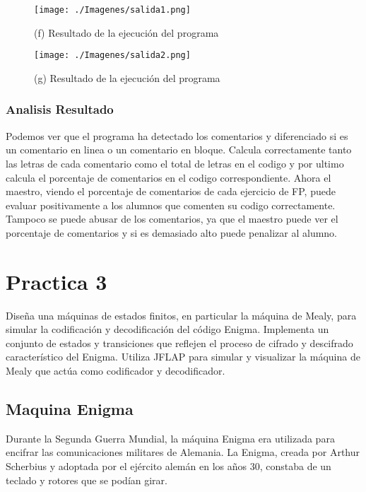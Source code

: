 \documentclass{article}
\begin{document}
        \newpage
        \begin{figure}[!h]
            \centering
            \texttt{[image: ./Imagenes/salida1.png]}
            \caption*{(f) Resultado de la ejecución del programa}
        \end{figure}

        \begin{figure}[!h]
            \centering
            \texttt{[image: ./Imagenes/salida2.png]}
            \caption*{(g) Resultado de la ejecución del programa}
        \end{figure}
        
        \subsubsection*{Analisis Resultado}
     Podemos ver que el programa ha detectado los comentarios y diferenciado si es un comentario en linea o 
     un comentario en bloque. Calcula correctamente tanto las letras de cada comentario como el total de letras en el codigo y por
     ultimo calcula el porcentaje de comentarios en el codigo  correspondiente.
     Ahora el maestro, viendo el porcentaje de comentarios de cada ejercicio de FP, puede evaluar positivamente a los alumnos que comenten su codigo correctamente.
     Tampoco se puede abusar de los comentarios, ya que el maestro puede ver el porcentaje de comentarios y si es demasiado alto puede penalizar al alumno.

    

    \newpage

    \section{Practica 3}
    Diseña una máquinas de estados finitos, en particular la máquina de Mealy, para simular la codificación y decodificación del código Enigma. Implementa un conjunto de estados y transiciones que reflejen el proceso de cifrado y descifrado característico del Enigma. Utiliza JFLAP para simular y visualizar la máquina de Mealy que actúa como codificador y decodificador.
    
    \vspace{\baselineskip} %
    \subsection{Maquina Enigma}
    Durante la Segunda Guerra Mundial, la máquina Enigma era utilizada para encifrar las comunicaciones militares de Alemania. La Enigma, creada por Arthur Scherbius y adoptada por el ejército alemán en los años 30, constaba de un teclado y rotores que se podían girar.    
    
\end{document}
